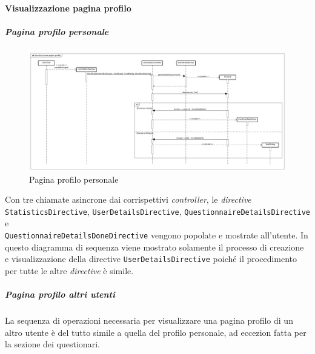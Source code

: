 \paragraph{Visualizzazione pagina profilo}

\subparagraph{Pagina profilo personale}

\label{Pagina profilo personale}

\begin{figure}[ht]
	\centering
	\includegraphics[scale=0.25,keepaspectratio]{UML/DiagrammiDiSequenza/Front-end/UserPage.png}
	\caption{Pagina profilo personale}
\end{figure} \FloatBarrier

Con tre chiamate asincrone dai corrispettivi \textit{controller}, le \textit{directive} \texttt{StatisticsDirective}, \texttt{UserDetailsDirective}, \texttt{QuestionnaireDetailsDirective} e \\ \texttt{QuestionnaireDetailsDoneDirective} vengono popolate e mostrate all'utente. 
In questo diagramma di sequenza viene mostrato solamente il processo di creazione e visualizzazione della directive \texttt{UserDetailsDirective} poiché il procedimento per tutte le altre \textit{directive} è simile.

\subparagraph{Pagina profilo altri utenti}

La sequenza di operazioni necessaria per visualizzare una pagina profilo di un altro utente è del tutto simile a quella del profilo personale, ad eccezion fatta per la sezione dei questionari. 
